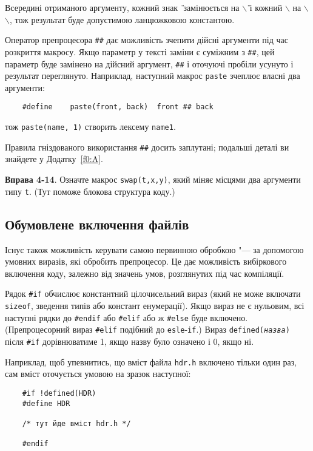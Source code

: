 \documentclass[a4paper,12pt]{book}
\begin{document}
  Всередині отриманого аргументу, кожний знак \texttt{\"{}} замінюється на
  \texttt{\mbox{$\backslash$}\"{}} і кожний \texttt{\mbox{$\backslash$}} на
  \texttt{\mbox{$\backslash$}\mbox{$\backslash$}}, тож результат буде допустимою
  ланцюжковою константою.

  Оператор препроцесора \texttt{\#\#} дає можливість зчепити дійсні аргументи під час
  розкриття макросу. Якщо параметр у тексті заміни є суміжним з \texttt{\#\#}, цей параметр
  буде замінено на дійсний аргумент, \texttt{\#\#} і оточуючі пробіли усунуто і результат
  переглянуто. Наприклад, наступний макрос \texttt{paste} зчеплює власні два аргументи:
  \begin{verbatim}
    #define    paste(front, back)  front ## back
  \end{verbatim}
  тож \texttt{paste(name, 1)} створить лексему \texttt{name1}.

  Правила гніздованого використання \texttt{\#\#} досить заплутані; подальші деталі ви
  знайдете у Додатку~\ref{f0:A}.

  \textbf{Вправа 4-14}. Означте макрос \texttt{swap(t,x,y)}, який міняє місцями два
  аргументи типу \texttt{t}. (Тут поможе блокова структура коду.)

\subsection{Обумовлене включення файлів}


  Існує також можливість керувати самою первинною обробкою "--- за допомогою умовних
  виразів, які обробить препроцесор. Це дає можливість вибіркового включення коду,
  залежно від значень умов, розглянутих під час компіляції.

  Рядок \texttt{\#if} обчислює константний цілочисельний вираз (який не може включати
  \texttt{sizeof}, зведення типів або констант енумерації). Якщо вираз не є нульовим, всі
  наступні рядки до \texttt{\#endif} або \texttt{\#elif} або ж \texttt{\#else} буде включено.
  (Препроцесорний вираз \texttt{\#elif} подібний до \texttt{esle}-\texttt{if}.) Вираз
  \texttt{defined(\textit{назва})} після \texttt{\#if} дорівнюватиме 1, якщо назву було
  означено і 0, якщо ні.

  Наприклад, щоб упевнитись, що вміст файла \texttt{hdr.h} включено тільки один раз, сам
  вміст оточується умовою на зразок наступної:
  \begin{verbatim}
    #if !defined(HDR)
    #define HDR

    /* тут йде вміст hdr.h */

    #endif
  \end{verbatim}
\end{document}
